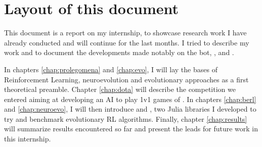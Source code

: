 \section*{Layout of this document}

This document is a report on my internship, to showcase research work I have already conducted and will continue for the last months. I tried to describe my work and to document the developments made notably on the \dota bot, \berl, and \neuroevo.

In chapters \ref{chap:prolegomena} and \ref{chap:evo}, I will lay the bases of Reinforcement Learning, neuroevolution and evolutionary approaches as a first theoretical preamble. Chapter \ref{chap:dota} will describe the competition we entered aiming at developing an AI to play 1v1 games of \dota. In chapters \ref{chap:berl} and \ref{chap:neuroevo}, I will then introduce \berl and \neuroevo, two Julia libraries I developed to try and benchmark evolutionary RL algorithms. 
Finally, chapter \ref{chap:results} will summarize results encountered so far and present the leads for future work in this internship.


